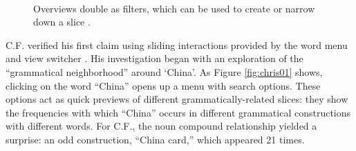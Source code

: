 \documentclass{sig-alternate}
\begin{document}
\begin{figure}[ht!]
\begin{center}
%
        \\
%
    \end{center}
    \caption{%
     Overviews double as filters, which can be used to create or narrow down a slice \label{fig:intro04}.
     }%
\end{figure}


C.F. verified his first claim using sliding interactions provided by the word menu and view switcher . His investigation began with an exploration of the ``grammatical neighborhood'' around `China'. As Figure \ref{fig:chris01} shows, clicking on the word ``China'' opens up a menu with search options. These options act as quick previews of different grammatically-related slices: they show the frequencies with which ``China'' occurs in different grammatical constructions with different words.  For C.F., the noun compound relationship yielded a surprise: an odd construction, ``China card,'' which appeared 21 times.
\end{document}
